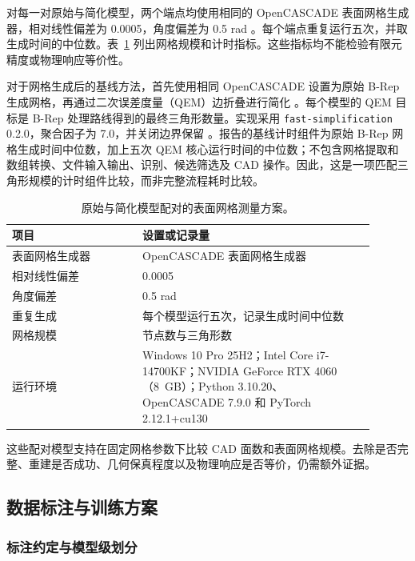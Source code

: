 \documentclass[12pt,a4paper]{ctexart}
\begin{document}
对每一对原始与简化模型，两个端点均使用相同的 OpenCASCADE 表面网格生成器，相对线性偏差为 0.0005，角度偏差为 0.5 rad \parencite{occt_mesh_2026}。每个端点重复运行五次，并取生成时间的中位数。表~\ref{tab:geometry_protocol} 列出网格规模和计时指标。这些指标均不能检验有限元精度或物理响应等价性。

对于网格生成后的基线方法，首先使用相同 OpenCASCADE 设置为原始 B-Rep 生成网格，再通过二次误差度量（QEM）边折叠进行简化 \parencite{garland1997qem}。每个模型的 QEM 目标是 B-Rep 处理路线得到的最终三角形数量。实现采用 \texttt{fast-simplification} 0.2.0，聚合因子为 7.0，并关闭边界保留 \parencite{fast_simplification_2026}。报告的基线计时组件为原始 B-Rep 网格生成时间中位数，加上五次 QEM 核心运行时间的中位数；不包含网格提取和数组转换、文件输入输出、识别、候选筛选及 CAD 操作。因此，这是一项匹配三角形规模的计时组件比较，而非完整流程耗时比较。

\begin{table}[!ht]
\centering
\small
\caption{原始与简化模型配对的表面网格测量方案。}\label{tab:geometry_protocol}
\begin{tabular}{p{0.32\linewidth}p{0.58\linewidth}}
\toprule
项目 & 设置或记录量 \\
\midrule
表面网格生成器 & OpenCASCADE 表面网格生成器 \\
相对线性偏差 & 0.0005 \\
角度偏差 & 0.5 rad \\
重复生成 & 每个模型运行五次，记录生成时间中位数 \\
网格规模 & 节点数与三角形数 \\
运行环境 & Windows 10 Pro 25H2；Intel Core i7-14700KF；NVIDIA GeForce RTX 4060（8~GB）；Python 3.10.20、OpenCASCADE 7.9.0 和 PyTorch 2.12.1+cu130 \\
\bottomrule
\end{tabular}
\end{table}

这些配对模型支持在固定网格参数下比较 CAD 面数和表面网格规模。去除是否完整、重建是否成功、几何保真程度以及物理响应是否等价，仍需额外证据。

\subsection{数据标注与训练方案}\label{sec:data_training}

\subsubsection{标注约定与模型级划分}\label{sec:data_partition}
\end{document}

